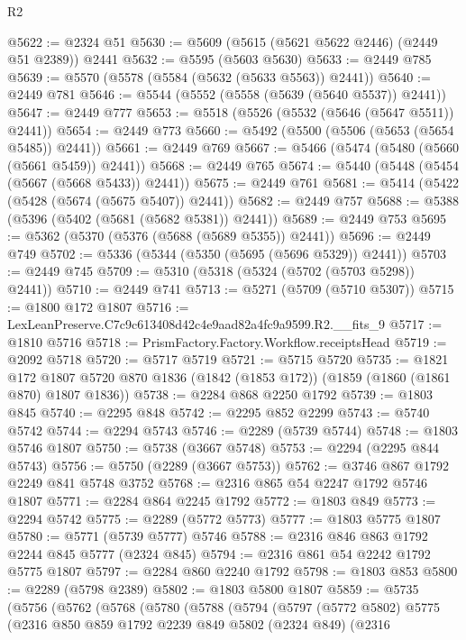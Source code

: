 \begin{lexlean}{R2}
\begin{coremodule}
@5622 := @2324 @51
@5630 := @5609 (@5615 (@5621 @5622 @2446) (@2449 @51 @2389)) @2441
@5632 := @5595 (@5603 @5630)
@5633 := @2449 @785
@5639 := @5570 (@5578 (@5584 (@5632 (@5633 @5563)) @2441))
@5640 := @2449 @781
@5646 := @5544 (@5552 (@5558 (@5639 (@5640 @5537)) @2441))
@5647 := @2449 @777
@5653 := @5518 (@5526 (@5532 (@5646 (@5647 @5511)) @2441))
@5654 := @2449 @773
@5660 := @5492 (@5500 (@5506 (@5653 (@5654 @5485)) @2441))
@5661 := @2449 @769
@5667 := @5466 (@5474 (@5480 (@5660 (@5661 @5459)) @2441))
@5668 := @2449 @765
@5674 := @5440 (@5448 (@5454 (@5667 (@5668 @5433)) @2441))
@5675 := @2449 @761
@5681 := @5414 (@5422 (@5428 (@5674 (@5675 @5407)) @2441))
@5682 := @2449 @757
@5688 := @5388 (@5396 (@5402 (@5681 (@5682 @5381)) @2441))
@5689 := @2449 @753
@5695 := @5362 (@5370 (@5376 (@5688 (@5689 @5355)) @2441))
@5696 := @2449 @749
@5702 := @5336 (@5344 (@5350 (@5695 (@5696 @5329)) @2441))
@5703 := @2449 @745
@5709 := @5310 (@5318 (@5324 (@5702 (@5703 @5298)) @2441))
@5710 := @2449 @741
@5713 := @5271 (@5709 (@5710 @5307))
@5715 := @1800 @172 @1807
@5716 := LexLeanPreserve.C7c9c613408d42c4e9aad82a4fc9a9599.R2.__fits_9
@5717 := @1810 @5716
@5718 := PrismFactory.Factory.Workflow.receiptsHead
@5719 := @2092 @5718
@5720 := @5717 @5719
@5721 := @5715 @5720
@5735 := @1821
    @172
    @1807
    @5720
    @870
    @1836
    (@1842 (@1853 @172))
    (@1859 (@1860 (@1861 @870) @1807 @1836))
@5738 := @2284 @868 @2250 @1792
@5739 := @1803 @845
@5740 := @2295 @848
@5742 := @2295 @852 @2299
@5743 := @5740 @5742
@5744 := @2294 @5743
@5746 := @2289 (@5739 @5744)
@5748 := @1803 @5746 @1807
@5750 := @5738 (@3667 @5748)
@5753 := @2294 (@2295 @844 @5743)
@5756 := @5750 (@2289 (@3667 @5753))
@5762 := @3746 @867 @1792 @2249 @841 @5748 @3752
@5768 := @2316 @865 @54 @2247 @1792 @5746 @1807
@5771 := @2284 @864 @2245 @1792
@5772 := @1803 @849
@5773 := @2294 @5742
@5775 := @2289 (@5772 @5773)
@5777 := @1803 @5775 @1807
@5780 := @5771 (@5739 @5777) @5746
@5788 := @2316 @846 @863 @1792 @2244 @845 @5777 (@2324 @845)
@5794 := @2316 @861 @54 @2242 @1792 @5775 @1807
@5797 := @2284 @860 @2240 @1792
@5798 := @1803 @853
@5800 := @2289 (@5798 @2389)
@5802 := @1803 @5800 @1807
@5859 := @5735
    (@5756
      (@5762
        (@5768
          (@5780
            (@5788
              (@5794
                (@5797
                  (@5772 @5802)
                  @5775
                  (@2316
                    @850
                    @859
                    @1792
                    @2239
                    @849
                    @5802
                    (@2324 @849)
                    (@2316

\end{coremodule}
\end{lexlean}
